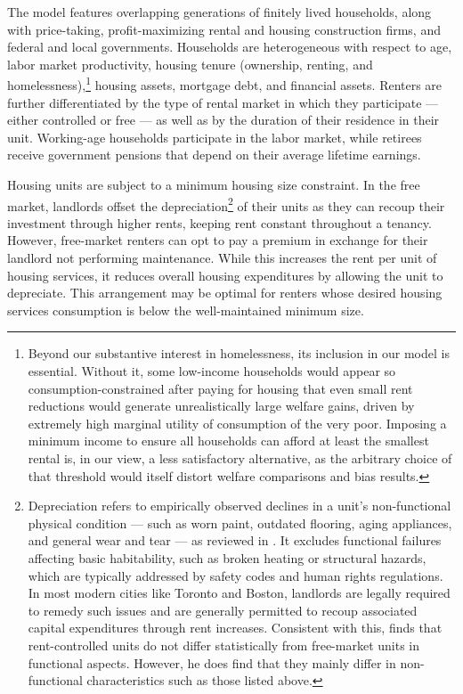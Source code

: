 \documentclass[parskip=full]{article}
\begin{document}
The model features overlapping generations of finitely lived households, along with price-taking, profit-maximizing rental and housing construction firms, and federal and local governments. Households are heterogeneous with respect to age, labor market productivity, housing tenure (ownership, renting, and homelessness),\footnote{Beyond our substantive interest in homelessness, its inclusion in our model is essential. Without it, some low-income households would appear so consumption-constrained after paying for housing that even small rent reductions would generate unrealistically large welfare gains, driven by extremely high marginal utility of consumption of the very poor. Imposing a minimum income to ensure all households can afford at least the smallest rental is, in our view, a less satisfactory alternative, as the arbitrary choice of that threshold would itself distort welfare comparisons and bias results.} housing assets, mortgage debt, and financial assets. Renters are further differentiated by the type of rental market in which they participate — either controlled or free — as well as by the duration of their residence in their unit. Working-age households participate in the labor market, while retirees receive government pensions that depend on their average lifetime earnings.

Housing units are subject to a minimum housing size constraint. In the free market, landlords offset the depreciation\footnote{Depreciation refers to empirically observed declines in a unit’s non-functional physical condition — such as worn paint, outdated flooring, aging appliances, and general wear and tear — as reviewed in \citet{kholodilin2024rent}. It excludes functional failures affecting basic habitability, such as broken heating or structural hazards, which are typically addressed by safety codes and human rights regulations. In most modern cities like Toronto and Boston, landlords are legally required to remedy such issues and are generally permitted to recoup associated capital expenditures through rent increases. Consistent with this, \citet{sims-2007} finds that rent-controlled units do not differ statistically from free-market units in functional aspects. However, he does find that they mainly differ in non-functional characteristics such as those listed above.} of their units as they can recoup their investment through higher rents, keeping rent constant throughout a tenancy. However, free-market renters can opt to pay a premium in exchange for their landlord not performing maintenance. While this increases the rent per unit of housing services, it reduces overall housing expenditures by allowing the unit to depreciate. This arrangement may be optimal for renters whose desired housing services consumption is below the well-maintained minimum size.
\end{document}

